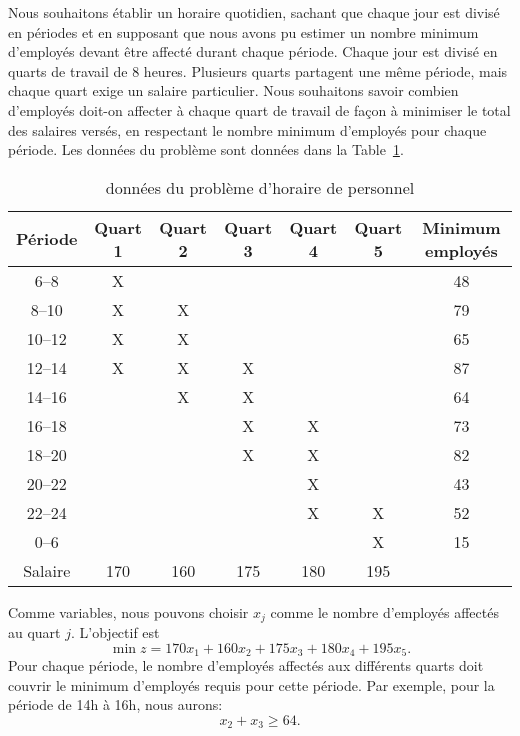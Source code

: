 \begin{example}
Nous souhaitons établir un horaire quotidien, sachant que chaque jour est divisé en périodes et en supposant que nous avons pu estimer un nombre minimum d'employés devant être affecté durant chaque période.
Chaque jour est divisé en quarts de travail de 8 heures. Plusieurs quarts partagent une même période, mais chaque quart exige un salaire particulier.
Nous souhaitons savoir combien d'employés doit-on affecter à chaque quart de travail de façon à minimiser le total des salaires versés, en respectant le nombre minimum d'employés pour chaque période. Les données du problème sont données dans la Table~\ref{tab:horaire}.

\begin{table}[htbp]
\begin{center}
\begin{tabular}{|c|c|c|c|c|c|c|}
\hline
Période & Quart 1 & Quart 2 & Quart 3 & Quart 4 & Quart 5 & Minimum employés \\
\hline
6--8 & X & & & & & 48 \\
\hline
8--10 & X & X & & & & 79 \\
\hline
10--12 & X & X & & & & 65 \\
\hline
12--14 & X & X & X & & & 87 \\
\hline
14--16 & & X & X & & & 64 \\
\hline
16--18 & & & X & X & & 73 \\
\hline
18--20 & & & X & X & & 82 \\
\hline
20--22 & & & & X & & 43 \\
\hline
22--24 & & & & X & X & 52 \\
\hline
0--6 & & & & & X & 15 \\
\hline
Salaire & 170 & 160 & 175 & 180 & 195 & \\
\hline
\end{tabular}
\caption{données du problème d'horaire de personnel}
\label{tab:horaire}
\end{center}
\end{table}

Comme variables, nous pouvons choisir $x_j$ comme le nombre d'employés affectés au quart $j$.
L'objectif est
\[
\min z = 170 x_1 + 160 x_2 + 175 x_3 + 180 x_4 + 195 x_5.
\]
Pour chaque période, le nombre d'employés affectés aux différents quarts doit couvrir le minimum d'employés requis pour cette période. Par exemple, pour la période de 14h à 16h, nous aurons:
\[
x_2+x_3 \geq 64.
\]


\end{example}
